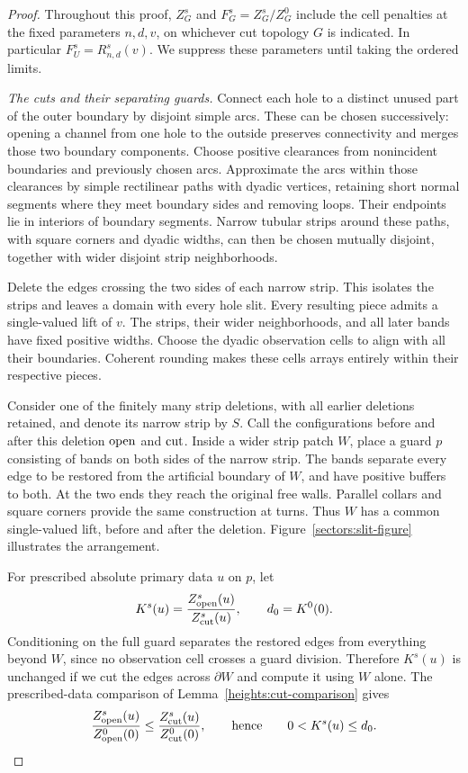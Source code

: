 \begin{proof}
Throughout this proof, \(Z_G^s\) and \(F_G^s=Z_G^s/Z_G^0\) include
the cell penalties at the fixed parameters \(n,d,v\), on whichever
cut topology \(G\) is indicated. In particular
\(F_U^s=R_{n,d}^s(v)\). We suppress these parameters until taking
the ordered limits.

\emph{The cuts and their separating guards.}
Connect each hole to a distinct unused part of the outer boundary
by disjoint simple arcs. These can be chosen successively: opening
a channel from one hole to the outside preserves connectivity and
merges those two boundary components. Choose positive clearances
from nonincident boundaries and previously chosen arcs. Approximate
the arcs within those clearances by simple rectilinear paths with
dyadic vertices, retaining short normal segments where they meet
boundary sides and removing loops. Their endpoints lie in interiors
of boundary segments. Narrow tubular strips around these paths,
with square corners and dyadic widths, can then be chosen mutually
disjoint, together with wider disjoint strip neighborhoods.

Delete the edges crossing the two sides of each narrow strip.
This isolates the strips and leaves a domain with every hole slit.
Every resulting piece admits a single-valued lift of \(v\).
The strips, their wider neighborhoods, and all later bands have
fixed positive widths. Choose the dyadic observation cells to align
with all their boundaries. Coherent rounding makes these cells
arrays entirely within their respective pieces.

Consider one of the finitely many strip deletions, with all earlier
deletions retained, and denote its narrow strip by \(S\).
Call the configurations before and after this
deletion \({\rm open}\) and \({\rm cut}\).
Inside a wider strip patch \(W\), place a guard \(p\) consisting of
bands on both sides of the narrow strip. The bands separate every
edge to be restored from the artificial boundary of \(W\), and
have positive buffers to both. At the two ends they reach the
original free walls. Parallel collars and square corners provide
the same construction at turns. Thus \(W\) has a common
single-valued lift, before and after the deletion.
Figure~\ref{sectors:slit-figure} illustrates the arrangement.



For prescribed absolute primary data \(u\) on \(p\), let
\[
 K^s(u)=\frac{Z_{\rm open}^s(u)}{Z_{\rm cut}^s(u)},
 \qquad d_0=K^0(0).
\]
Conditioning on the full guard separates the restored edges from
everything beyond \(W\), since no observation cell crosses a guard
division. Therefore \(K^s(u)\) is unchanged if we cut the edges
across \(\partial W\) and compute it using \(W\) alone.
The prescribed-data comparison of
Lemma~\ref{heights:cut-comparison} gives
\[
 \frac{Z_{\rm open}^s(u)}{Z_{\rm open}^0(0)}
 \le
 \frac{Z_{\rm cut}^s(u)}{Z_{\rm cut}^0(0)},
 \qquad\hbox{hence}\qquad 0<K^s(u)\le d_0.
\]


\end{proof}
